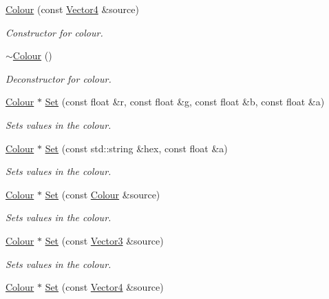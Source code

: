\begin{DoxyCompactItemize}
\hyperlink{class_flounder_1_1_colour_a82555ece314688c6aa52328ed41933eb}{Colour} (const \hyperlink{class_flounder_1_1_vector4}{Vector4} \&source)
\begin{DoxyCompactList}\small\item\em Constructor for colour. \end{DoxyCompactList}\item 
\hyperlink{class_flounder_1_1_colour_a8d3e28d448e13a736421120454c4a7bb}{$\sim$\+Colour} ()
\begin{DoxyCompactList}\small\item\em Deconstructor for colour. \end{DoxyCompactList}\item 
\hyperlink{class_flounder_1_1_colour}{Colour} $\ast$ \hyperlink{class_flounder_1_1_colour_a468af4678d790c13f6446b6c22d2cf6d}{Set} (const float \&r, const float \&g, const float \&b, const float \&a)
\begin{DoxyCompactList}\small\item\em Sets values in the colour. \end{DoxyCompactList}\item 
\hyperlink{class_flounder_1_1_colour}{Colour} $\ast$ \hyperlink{class_flounder_1_1_colour_ab0d881f8ed0eb9f6f680988dfdf756e0}{Set} (const std\+::string \&hex, const float \&a)
\begin{DoxyCompactList}\small\item\em Sets values in the colour. \end{DoxyCompactList}\item 
\hyperlink{class_flounder_1_1_colour}{Colour} $\ast$ \hyperlink{class_flounder_1_1_colour_a79666b8c2792951d96a244bb81917fb2}{Set} (const \hyperlink{class_flounder_1_1_colour}{Colour} \&source)
\begin{DoxyCompactList}\small\item\em Sets values in the colour. \end{DoxyCompactList}\item 
\hyperlink{class_flounder_1_1_colour}{Colour} $\ast$ \hyperlink{class_flounder_1_1_colour_a94933bab6cb6128f207472ec0554aeeb}{Set} (const \hyperlink{class_flounder_1_1_vector3}{Vector3} \&source)
\begin{DoxyCompactList}\small\item\em Sets values in the colour. \end{DoxyCompactList}\item 
\hyperlink{class_flounder_1_1_colour}{Colour} $\ast$ \hyperlink{class_flounder_1_1_colour_abfe987ab057d8c17cd9d18613fcee303}{Set} (const \hyperlink{class_flounder_1_1_vector4}{Vector4} \&source)

\end{DoxyCompactItemize}
